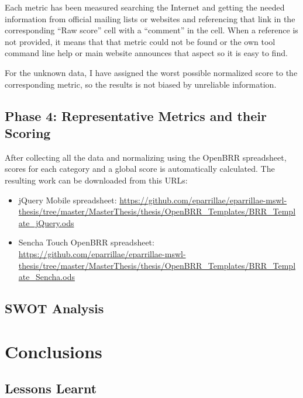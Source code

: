 \documentclass[a4paper,12pt]{book}
\begin{document}
Each metric has been measured searching the Internet and getting the needed information from official mailing lists or websites and referencing that link in the corresponding ``Raw score'' cell with a ``comment'' in the cell. When a
reference is not provided, it means that that metric could not be found or the own tool command line help or main website announces that aspect so it is
easy to find.

For the unknown data, I have assigned the worst possible normalized score to
the corresponding metric, so the results is not biased by unreliable
information.

\section{Phase 4: Representative Metrics and their Scoring}
\label{sec:phase4}

After collecting all the data and normalizing using the OpenBRR spreadsheet,
scores for each category and a global score is automatically calculated.
The resulting work can be downloaded from this URLs:

\begin{itemize}
 \item jQuery Mobile spreadsheet:
\url{
https://github.com/eparrillae/eparrillae-mswl-thesis/tree/master/MasterThesis/thesis/OpenBRR_Templates/BRR_Template_jQuery.ods}

 \item Sencha Touch OpenBRR spreadsheet:
\url{
https://github.com/eparrillae/eparrillae-mswl-thesis/tree/master/MasterThesis/thesis/OpenBRR_Templates/BRR_Template_Sencha.ods}
\end{itemize}



\section{SWOT Analysis}
\label{sec:swot}


\chapter{Conclusions}
\label{chap:conclusions}


\section{Lessons Learnt}
\label{sec:lessons}
\end{document}
